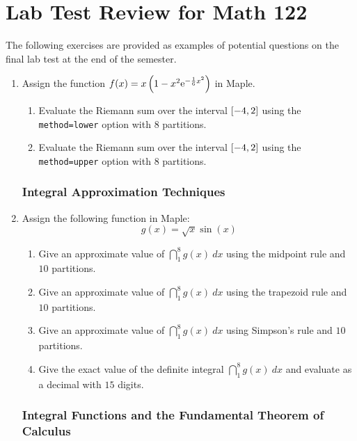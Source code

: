 \chapter{Lab Test Review for Math 122}
\label{chp:lab_test_review_math_122}

The following exercises are provided as examples of potential questions on the final lab test at the end of the semester.

\begin{enumerate}

\subsection{Riemann Sums}

\item Assign the function $f(x) = x \left(1-x^2 {\rm e}^{-\frac{1}{6}x^2}\right)$ in Maple.
	\begin{enumerate}
	\item Evaluate the Riemann sum over the interval $\left[-4,2\right]$ using the \texttt{method=lower} option with $8$ partitions.
	\item Evaluate the Riemann sum over the interval $\left[-4,2\right]$ using the \texttt{method=upper} option with $8$ partitions.
	\end{enumerate}
	
\subsection{Integral Approximation Techniques}

\item Assign the following function in Maple: \[ g(x) = \sqrt{x} \sin(x) \]
	\begin{enumerate}
	\item Give an approximate value of $\dint_{1}^{8} g(x)~dx$ using the midpoint rule and $10$ partitions.
	\item Give an approximate value of $\dint_{1}^{8} g(x)~dx$ using the trapezoid rule and $10$ partitions.
	\item Give an approximate value of $\dint_{1}^{8} g(x)~dx$ using Simpson's rule and $10$ partitions.
	\item Give the exact value of the definite integral $\dint_{1}^{8} g(x)~dx$ and evaluate as a decimal with $15$ digits.
	\end{enumerate}

\subsection{Integral Functions and the Fundamental Theorem of Calculus}


\end{enumerate}
